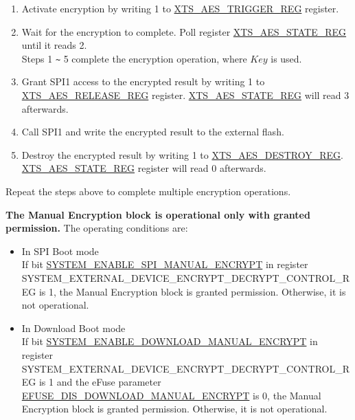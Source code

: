 \documentclass[main\_\_EN.tex]{subfiles}
\begin{document}
\begin{enumerate}
    \item Activate encryption by writing 1 to \hyperref[regdesc:XTSAESTRIGGERREG]{XTS\_AES\_TRIGGER\_REG} register.

    \item \label{Wait for calculation done in xts}
        Wait for the encryption to complete. Poll register \hyperref[regdesc:XTSAESSTATEREG]{XTS\_AES\_STATE\_REG} until it reads 2.\\
Steps 1 \verb+~+ 5 complete the encryption operation, where \begin{math}Key\end{math} is used.

    \item \label{release access permission}
        Grant SPI1 access to the encrypted result by writing 1 to \hyperref[regdesc:XTSAESRELEASEREG]{XTS\_AES\_RELEASE\_REG} register.  \hyperref[regdesc:XTSAESSTATEREG]{XTS\_AES\_STATE\_REG} will read 3 afterwards.

    \item \label{invoke spi and wait until done}
        Call SPI1 and write the encrypted result to the external flash.

    \item \label{destroy ciphertext result and return to idle}
        Destroy the encrypted result by writing 1 to \hyperref[regdesc:XTSAESDESTROYREG]{XTS\_AES\_DESTROY\_REG}.  \hyperref[regdesc:XTSAESSTATEREG]{XTS\_AES\_STATE\_REG} register will read 0 afterwards.

\end{enumerate}
Repeat the steps above to complete multiple encryption operations.


\textbf{The Manual Encryption block is operational only with granted permission.} The operating conditions are:

\begin{itemize}

    \item In SPI Boot mode\\
If bit \hyperref[fielddesc:SYSTEMENABLESPIMANUALENCRYPT]{SYSTEM\_ENABLE\_SPI\_MANUAL\_ENCRYPT} in register\\ SYSTEM\_EXTERNAL\_DEVICE\_ENCRYPT\_DECRYPT\_CONTROL\_REG is 1, the Manual Encryption block is granted permission. Otherwise, it is not operational.

    \item In Download Boot mode\\
If bit \hyperref[fielddesc:SYSTEMENABLEDOWNLOADMANUALENCRYPT]{SYSTEM\_ENABLE\_DOWNLOAD\_MANUAL\_ENCRYPT} in register\\ SYSTEM\_EXTERNAL\_DEVICE\_ENCRYPT\_DECRYPT\_CONTROL\_REG is 1 and the eFuse parameter\\ \hyperref[fielddesc:EFUSEDISDOWNLOADMANUALENCRYPT]{EFUSE\_DIS\_DOWNLOAD\_MANUAL\_ENCRYPT} is 0, the Manual Encryption block is granted permission. Otherwise, it is not operational.

\end{itemize}
\end{document}
